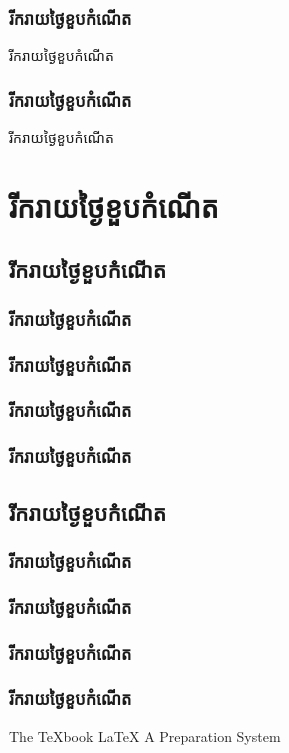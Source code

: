 \documentclass[12pt,a4paper,black]{diamond}
\begin{document}
	\section{រីករាយថ្ងៃខួបកំណើត}
	\begin{practice}
		រីករាយថ្ងៃខួបកំណើត
	\end{practice}
	\section{រីករាយថ្ងៃខួបកំណើត}
	\begin{explanation}
		រីករាយថ្ងៃខួបកំណើត
	\end{explanation}
	\part{រីករាយថ្ងៃខួបកំណើត}
	\chapter{រីករាយថ្ងៃខួបកំណើត}
	\section{រីករាយថ្ងៃខួបកំណើត}
	\section{រីករាយថ្ងៃខួបកំណើត}
	\section{រីករាយថ្ងៃខួបកំណើត}
	\section{រីករាយថ្ងៃខួបកំណើត}
	\appendix
	\chapter{រីករាយថ្ងៃខួបកំណើត}
	\section{រីករាយថ្ងៃខួបកំណើត}
	\section{រីករាយថ្ងៃខួបកំណើត}
	\section{រីករាយថ្ងៃខួបកំណើត}
	\section{រីករាយថ្ងៃខួបកំណើត}
	\backmatter
	\begin{thebibliography}{2}
		 The TeXbook
		 LaTeX A Preparation System
	\end{thebibliography}
\end{document}

